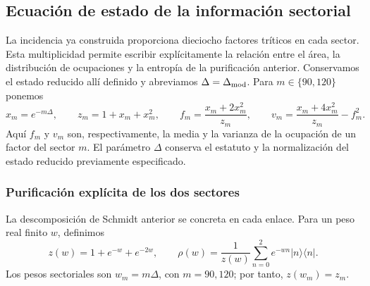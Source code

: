 \subsection{Ecuación de estado de la información sectorial}
\label{v:ant:sec:ii-ecuacion-informacion}

La incidencia ya construida proporciona dieciocho factores tríticos en
cada sector. Esta multiplicidad permite escribir explícitamente la
relación entre el área, la distribución de ocupaciones y la entropía de
la purificación anterior. Conservamos el estado reducido allí definido
y abreviamos $\Delta=\Delta_{\rm mod}$. Para $m\in\{90,120\}$ ponemos
\begin{equation}
 x_m=e^{-m\Delta},\qquad z_m=1+x_m+x_m^2,\qquad
 f_m=\frac{x_m+2x_m^2}{z_m},\qquad
 v_m=\frac{x_m+4x_m^2}{z_m}-f_m^2.
 \label{v:ant:eq:ii-sector-momentos}
\end{equation}
Aquí $f_m$ y $v_m$ son, respectivamente, la media y la varianza de
la ocupación de un factor del sector $m$. El parámetro $\Delta$ conserva
el estatuto y la normalización del estado reducido previamente
especificado.

\subsubsection{Purificación explícita de los dos sectores}
\label{v:ant:sec:ii-area-purificacion-producto}

La descomposición de Schmidt anterior se concreta en cada enlace.
Para un peso real finito \(w\), definimos
\[
 z(w)=1+e^{-w}+e^{-2w},\qquad
 \rho(w)=\frac1{z(w)}\sum_{n=0}^2e^{-wn}|n\rangle\langle n|.
\]
Los pesos sectoriales son \(w_m=m\Delta\), con \(m=90,120\);
por tanto, \(z(w_m)=z_m\).

